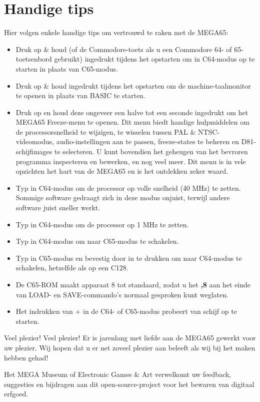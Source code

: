 \section{Handige tips}

Hier volgen enkele handige tips om vertrouwd te raken met de MEGA65:

\begin{itemize}

\item{Druk op \& houd \megasymbolkey (of de Commodore-toets als u een Commodore 64- of 65-toetsenbord gebruikt) ingedrukt tijdens het opstarten om in C64-modus op te starten in plaats van C65-modus.}
 \item{Druk op \& houd  ingedrukt tijdens het opstarten om de machine-taalmonitor te openen in plaats van BASIC te starten.}
\item{Druk op  en houd deze ongeveer een halve tot een seconde ingedrukt om het MEGA65 Freeze-menu te openen. Dit menu biedt handige hulpmiddelen om de processorsnelheid te wijzigen, te wisselen tussen PAL \& NTSC-videomodus, audio-instellingen aan te passen, freeze-states te beheren en D81-schijfimages te selecteren. U kunt bovendien het geheugen van het bevroren programma inspecteren en bewerken, en nog veel meer. Dit menu is in vele opzichten het hart van de MEGA65 en is het ontdekken zeker waard.}
\item{Typ  in C64-modus om de processor op volle snelheid (40 MHz) te zetten. Sommige software gedraagt zich in deze modus onjuist, terwijl andere software juist sneller werkt.}
\item{Typ  in C64-modus om de processor op 1 MHz te zetten.}
\item{Typ  in C64-modus om naar C65-modus te schakelen.}
\item{Typ  in C65-modus en bevestig door  in te drukken om naar C64-modus te schakelen, hetzelfde als op een C128.}
\item{De C65-ROM maakt apparaat 8 tot standaard, zodat u het \textbf{,8} aan het einde van LOAD- en SAVE-commando's normaal gesproken kunt weglaten.}
\item{Het indrukken van  +  in de C64- of C65-modus probeert van schijf op te starten.}
\end{itemize}

Veel plezier! Veel plezier! Er is jarenlang met liefde aan de MEGA65 gewerkt voor uw plezier. Wij hopen dat u er net zoveel plezier aan beleeft als wij bij het maken hebben gehad!

Het MEGA Museum of Electronic Games \& Art verwelkomt uw feedback, suggesties en bijdragen aan dit open-source-project voor het bewaren van digitaal erfgoed.
